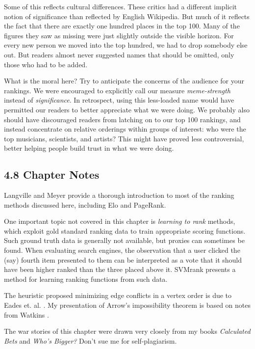 \documentclass[10pt]{article}
\begin{document}
\begin{itemize}
Some of this reflects cultural differences. These critics had a different implicit notion of significance than reflected by English Wikipedia. But much of it reflects the fact that there are exactly one hundred places in the top 100. Many of the figures they saw as missing were just slightly outside the visible horizon. For every new person we moved into the top hundred, we had to drop somebody else out. But readers almost never suggested names that should be omitted, only those who had to be added.
\end{itemize}

What is the moral here? Try to anticipate the concerns of the audience for your rankings. We were encouraged to explicitly call our measure \emph{meme-strength} instead of \emph{significance}. In retrospect, using this less-loaded name would have permitted our readers to better appreciate what we were doing. We probably also should have discouraged readers from latching on to our top 100 rankings, and instead concentrate on relative orderings within groups of interest: who were the top musicians, scientists, and artists? This might have proved less controversial, better helping people build trust in what we were doing.

\subsection*{4.8 Chapter Notes}
Langville and Meyer \cite{LM12} provide a thorough introduction to most of the ranking methods discussed here, including Elo and PageRank.


One important topic not covered in this chapter is \emph{learning to rank} methods, which exploit gold standard ranking data to train appropriate scoring functions. Such ground truth data is generally not available, but proxies can sometimes be found. When evaluating search engines, the observation that a user clicked the (say) fourth item presented to them can be interpreted as a vote that it should have been higher ranked than the three placed above it. SVMrank \cite{Joa02} presents a method for learning ranking functions from such data.

The heuristic proposed minimizing edge conflicts in a vertex order is due to Eades et. al. \cite{ELS93}. My presentation of Arrow's impossibility theorem is based on notes from Watkins \cite{Wat16}.

The war stories of this chapter were drawn very closely from my books \emph{Calculated Bets} and \emph{Who's Bigger?} Don't sue me for self-plagiarism.
\end{document}
